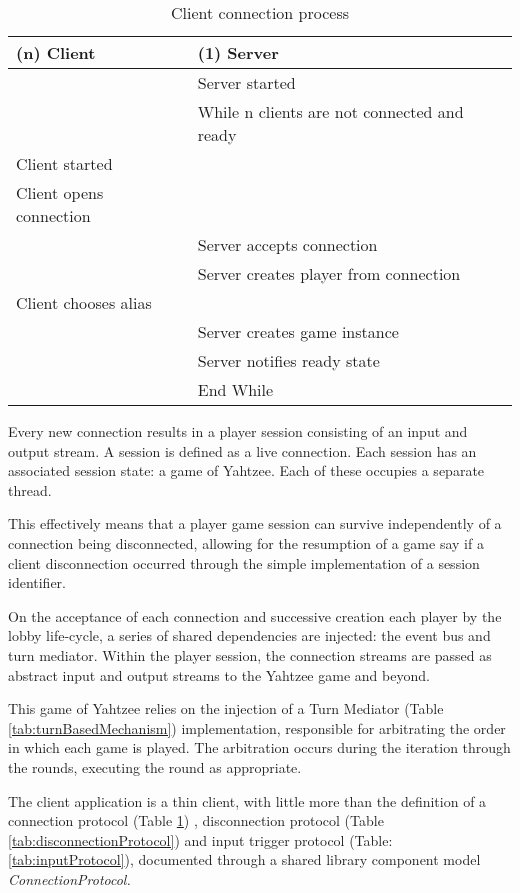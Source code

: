 \begin{table}[H]
	\centering
	\begin{tabular}{ | l | l | }
		\hline
		(n) Client & (1) Server \\
		\hline
		\hline
		 & Server started \\
		 \hline
		 & While n clients are not connected and ready \\
		 \hline
		 Client started  & \\
		 \hline
		Client opens connection & \\
		 \hline
		 & Server accepts connection \\
		 \hline
		 & Server creates player from connection  \\
		 \hline
		Client chooses alias & \\
		 \hline
		& Server creates game instance \\
		\hline
		& Server notifies ready state  \\
		 \hline
		& End While \\
		\hline
	\end{tabular}
	\caption{Client connection process}
	\label{tab:connectionProtocol}
\end{table}

Every new connection results in a player session consisting of an input and output stream. A session is defined as a live connection. Each session has an associated session state: a game of Yahtzee. Each of these occupies a separate thread.

This effectively means that a player game session can survive independently of a connection being disconnected, allowing for the resumption of a game say if a client disconnection occurred through the simple implementation of a session identifier. %

On the acceptance of each connection and successive creation each player by the lobby life-cycle, a series of shared dependencies are injected: the event bus and turn mediator. Within the player session, the connection streams are passed as abstract input and output streams to the Yahtzee game and beyond.

This game of Yahtzee relies on the injection of a Turn Mediator (Table \ref{tab:turnBasedMechanism}) implementation, responsible for arbitrating the order in which each game is played. The arbitration occurs during the iteration through the rounds, executing the round as appropriate.

The client application is a thin client, with little more than the definition of a connection protocol (Table \ref{tab:connectionProtocol}) , disconnection protocol (Table \ref{tab:disconnectionProtocol}) and input trigger protocol (Table: \ref{tab:inputProtocol}), documented through a shared library component model \it{ConnectionProtocol}.

